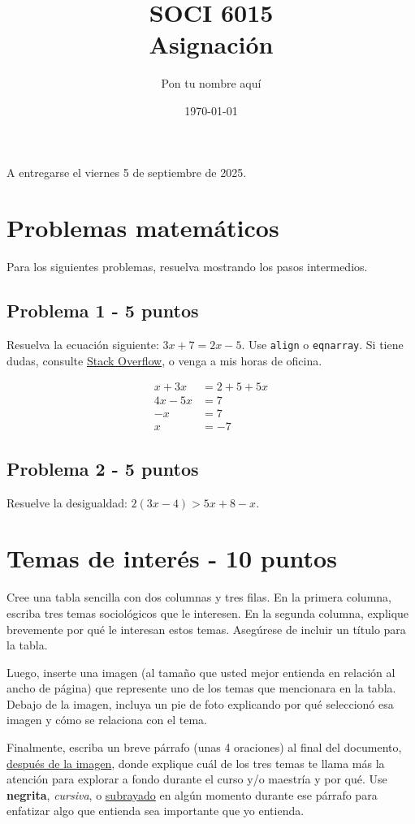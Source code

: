 \documentclass[11pt]{article} %
\title{SOCI 6015\\ Asignación \textnumero 1}
\author{Pon tu nombre aquí}
\date{\today}
\begin{document}
\maketitle
\begin{center}
   A entregarse el viernes 5 de septiembre de 2025. 
\end{center}


\section{Problemas matemáticos}

Para los siguientes problemas, resuelva mostrando los pasos intermedios.

\subsection{Problema 1 - 5 puntos} 

Resuelva la ecuación siguiente: $3x + 7 = 2x - 5$. Use \texttt{align} o \texttt{eqnarray}. Si tiene dudas, consulte \href{https://tex.stackexchange.com}{Stack Overflow}, o venga a mis horas de oficina.

\begin{align*}
    x+3x &= 2+5+5x \\
    4x-5x &= 7 \\
 -x &= 7 \\
 x &= -7
\end{align*}

\subsection{Problema 2 - 5 puntos} 

Resuelve la desigualdad: $2(3x - 4) > 5x + 8 - x$. 

\section{Temas de interés - 10 puntos}

Cree una tabla sencilla con dos columnas y tres filas. En la primera columna, escriba tres temas sociológicos que le interesen. En la segunda columna, explique brevemente por qué le interesan estos temas. Asegúrese de incluir un título para la tabla. 

Luego, inserte una imagen (al tamaño que usted mejor entienda en relación al ancho de página) que represente uno de los temas que mencionara en la tabla. Debajo de la imagen, incluya un pie de foto explicando por qué seleccionó esa imagen y cómo se relaciona con el tema. 

Finalmente, escriba un breve párrafo (unas 4 oraciones) al final del documento, \underline{después de la imagen}, donde explique cuál de los tres temas te llama más la atención para explorar a fondo durante el curso y/o maestría y por qué. Use \textbf{negrita}, \textit{cursiva}, o \underline{subrayado} en algún momento durante ese párrafo para enfatizar algo que entienda sea importante que yo entienda.
\end{document}
